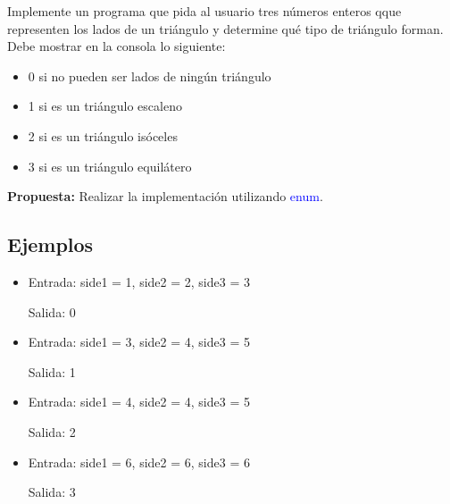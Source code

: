 Implemente un programa que pida al usuario tres números enteros qque representen los lados de un triángulo y determine qué tipo de triángulo forman. Debe mostrar en la consola lo siguiente:
\begin{itemize}
	\item 0 si no pueden ser lados de ningún triángulo
	\item 1 si es un triángulo escaleno
	\item 2 si es un triángulo isóceles
	\item 3 si es un triángulo equilátero
\end{itemize}

\textbf{Propuesta:} Realizar la implementación utilizando \textcolor{blue}{enum}.

\subsection*{Ejemplos}
\begin{itemize}
    \item Entrada: side1 = 1, side2 = 2, side3 = 3

    Salida: 0

    \item Entrada: side1 = 3, side2 = 4, side3 = 5

    Salida: 1

    \item Entrada: side1 = 4, side2 = 4, side3 = 5

     Salida: 2

     \item Entrada: side1 = 6, side2 = 6, side3 = 6
     
     Salida: 3
\end{itemize}
